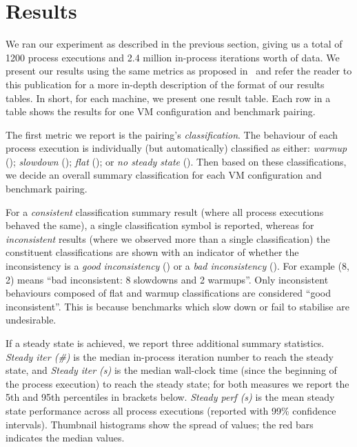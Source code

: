 \documentclass[a4paper]{article}
\begin{document}
\section{Results}
\label{sec:results}

We ran our experiment as described in the previous section, giving us a total
of 1200 process executions and 2.4 million in-process iterations worth of data.
We present our results using the same metrics as proposed
in~\cite{barrett16warmup} and refer the reader to this publication for a more
in-depth description of the format of our results tables. In short, for each
machine, we present one result table. Each row in a table shows the results for
one VM configuration and benchmark pairing.

The first metric we report is the pairing's \emph{classification}. The
behaviour of each process execution is individually (but automatically) classified as either:
\emph{warmup} (\warmup); \emph{slowdown} (\slowdown); \emph{flat} (\flatc); or
\emph{no steady state} (\nosteadystate). Then based on these classifications,
we decide an overall summary classification for each VM configuration and benchmark
pairing.

For a \emph{consistent} classification summary result (where all process
executions behaved the same), a single classification symbol is reported,
whereas for \emph{inconsistent} results (where we observed more than a single
classification) the constituent classifications are shown with an indicator of
whether the inconsistency is a \emph{good inconsistency} (\goodinconsistent)
or a \emph{bad inconsistency} (\badinconsistent). For example
\badinconsistent(8\slowdown, 2\warmup) means ``bad inconsistent: 8 slowdowns
and 2 warmups''. Only inconsistent behaviours composed of flat and warmup
classifications are considered ``good inconsistent''. This is because
benchmarks which slow down or fail to stabilise are undesirable.

If a steady state is achieved, we report three additional summary statistics.
\emph{Steady iter (\#)} is the median in-process iteration number to reach the
steady state, and \emph{Steady iter (s)} is the median wall-clock time (since
the beginning of the process execution) to reach the steady state; for both
measures we report the 5th and 95th percentiles in brackets below. \emph{Steady perf (s)}
is the mean steady state performance across all process executions (reported
with 99\% confidence intervals). Thumbnail histograms show the spread of
values; the red bars indicates the median values.
\end{document}
